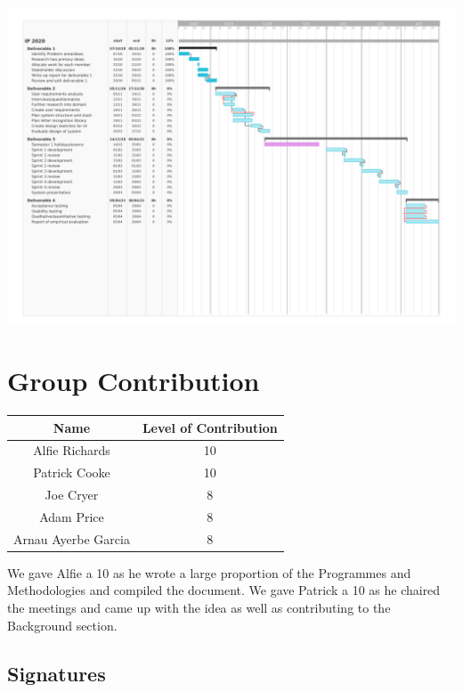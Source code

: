 \documentclass[10pt]{article}
\begin{document}
\includegraphics[width=\textwidth]{IpGantt.png}

\newpage




\newpage

\section{Group Contribution}

\begin{center}
\begin{tabular}{ |c|c| }
  \hline
  Name & Level of Contribution \\
  \hline
  Alfie Richards & 10 \\
  Patrick Cooke & 10 \\
  Joe Cryer & 8 \\
  Adam Price & 8 \\
  Arnau Ayerbe Garcia & 8 \\
  \hline
\end{tabular}
\end{center}

We gave Alfie a 10 as he wrote a large proportion of the Programmes and Methodologies and compiled 
the document. We gave Patrick a 10 as he chaired the meetings and came up with the idea as well as 
contributing to the Background section.

\subsection{Signatures}
\end{document}
